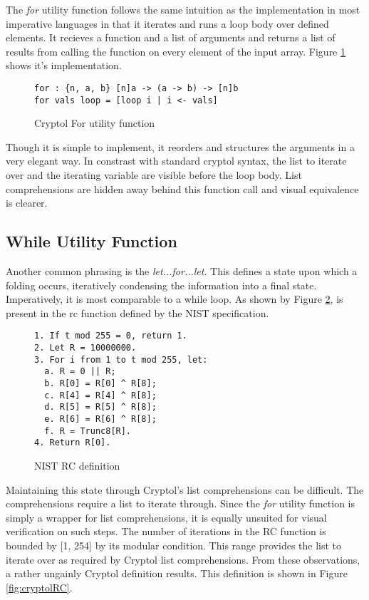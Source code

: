 The \emph{for} utility function follows the same intuition as the implementation in most imperative languages in that it iterates and runs a loop body over defined elements. 
It recieves a function and a list of arguments and returns a list of results from calling the function on every element of the input array. 
Figure \ref{fig:cryptolFor} shows it's implementation.

\begin{figure}[h]
  \centering
\begin{lstlisting}[language=Cryptol]
for : {n, a, b} [n]a -> (a -> b) -> [n]b
for vals loop = [loop i | i <- vals]
\end{lstlisting}
\caption{Cryptol For utility function}
\label{fig:cryptolFor}
\end{figure}

Though it is simple to implement, it reorders and structures the arguments in a very elegant way.
In constrast with standard cryptol syntax, the list to iterate over and the iterating variable are visible before the loop body. 
List comprehensions are hidden away behind this function call and visual equivalence is clearer.

\subsection{While Utility Function}
Another common phrasing is the \emph{let...for...let}. 
This defines a state upon which a folding occurs, iteratively condensing the information into a final state. 
Imperatively, it is most comparable to a while loop. 
As shown by Figure \ref{fig:nistRC}, is present in the rc function defined by the NIST specification.

\begin{figure}[h]
  \centering
\begin{lstlisting}[basewidth = {.5em},basicstyle={\scriptsize}]
1. If t mod 255 = 0, return 1.
2. Let R = 10000000.
3. For i from 1 to t mod 255, let:
  a. R = 0 || R;
  b. R[0] = R[0] ^ R[8];
  c. R[4] = R[4] ^ R[8];
  d. R[5] = R[5] ^ R[8];
  e. R[6] = R[6] ^ R[8];
  f. R = Trunc8[R].
4. Return R[0].
\end{lstlisting}
\caption{NIST RC definition}
\label{fig:nistRC}
\end{figure}

Maintaining this state through Cryptol's list comprehensions can be difficult.
The comprehensions require a list to iterate through. 
Since the \emph{for} utility function is simply a wrapper for list comprehensions, it is equally unsuited for visual verification on such steps. 
The number of iterations in the RC function is bounded by [1, 254] by its modular condition.
This range provides the list to iterate over as required by Cryptol list comprehensions. 
From these observations, a rather ungainly Cryptol definition results.
This definition is shown in Figure \ref{fig:cryptolRC}.

